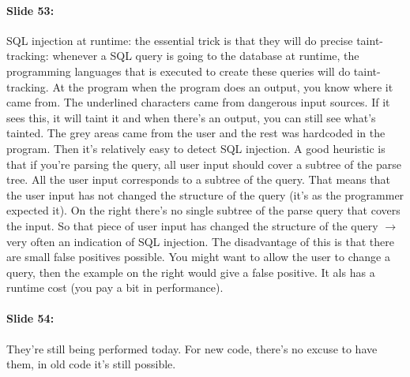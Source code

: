 \documentclass[10pt,a4paper]{report}
\begin{document}
\paragraph{Slide 53:} SQL injection at runtime: the essential trick is that they will do precise taint-tracking:  whenever a SQL query is going to the database at runtime, the programming languages that is executed to create these queries will do taint-tracking. At the program when the program does an output, you know where it came from. The underlined characters came from dangerous input sources. If it sees this, it will taint it and when there's an output, you can still see what's tainted. The grey areas came from the user and the rest was hardcoded in the program. Then it's relatively easy to detect SQL injection. A good heuristic is that if you're parsing the query, all user input should cover a subtree of the parse tree. All the user input corresponds to a subtree of the query. That means that the user input has not changed the structure of the query (it's as the programmer expected it). On the right there's no single subtree of the parse query that covers the input. So that piece of user input has changed the structure of the query $\rightarrow$ very often an indication of SQL injection. The disadvantage of this is that there are small false positives possible. You might want to allow the user to change a query, then the example on the right would give a false positive. It als has a runtime cost (you pay a bit in performance).

\paragraph{Slide 54:} They're still being performed today. For new code, there's no excuse to have them, in old code it's still possible. 
\end{document}
